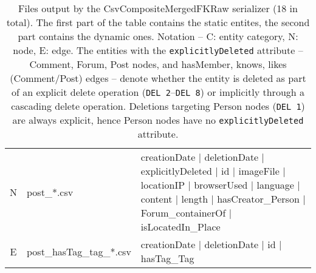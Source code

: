 \begin{table}[htb]
{\begin{tabular}{|c|l|l|}
            \hline
            N                    & post\_*.csv                          & creationDate | deletionDate | explicitlyDeleted | id | imageFile | locationIP | browserUsed | language | content | length | hasCreator\_Person | Forum\_containerOf | isLocatedIn\_Place \\
            E                    & post\_hasTag\_tag\_*.csv             & creationDate | deletionDate | id | hasTag\_Tag                                                                                                                                           \\
            \hline
        \end{tabular}}
    \caption{Files output by the CsvCompositeMergedFKRaw serializer (18 in total). The first part of the table contains the static entites, the second part contains the dynamic ones. Notation -- C: entity category, N: node, E: edge.
        The entities with the \texttt{explicitlyDeleted} attribute -- Comment, Forum, Post nodes, and hasMember, knows, likes (Comment/Post) edges -- denote whether the entity is deleted as part of an explicit delete operation (\texttt{DEL 2}--\texttt{DEL 8}) or implicitly through a cascading delete operation. Deletions targeting Person nodes (\texttt{DEL 1}) are always explicit, hence Person nodes have no \texttt{explicitlyDeleted} attribute.}
    \label{table:csv_composite_merge_foreign}
\end{table}
